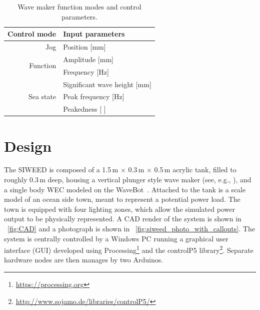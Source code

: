 \documentclass[hardware,article,submit,pdftex,moreauthors]{Definitions/mdpi}
\begin{document}
\begin{table}[tb]
  \caption{Wave maker function modes and control parameters.}
  \label{tab:wave_maker_controls}
  \centering

  \begin{tabular}{rl}
  \hline
  \textbf{Control mode}      & \textbf{Input parameters}        \\
  \hline
  Jog                        & Position {[}mm{]}                \\
  \hline
  \multirow{2}{*}{Function}  & Amplitude {[}mm{]}               \\
                             & Frequency {[}Hz{]}               \\
  \hline
  \multirow{3}{*}{Sea state} & Significant wave height {[}mm{]} \\
                             & Peak frequency {[}Hz{]}          \\
                             & Peakedness {[} {]}               \\       
  \hline
  \end{tabular}
\end{table}


\section{Design} %
The SIWEED is composed of a 1.5\,m $\times{}$ 0.3\,m $\times{}$ 0.5\,m acrylic tank, filled to roughly 0.3\,m deep, housing a vertical plunger style wave maker (see, e.g., \cite{hyun1976simplified}), and a single body WEC modeled on the WaveBot~\cite{Coe2016a}.
Attached to the tank is a scale model of an ocean side town, meant to represent a potential power load.
The town is equipped with four lighting zones, which allow the simulated power output to be physically represented.
A CAD render of the system is shown in \figurename~\ref{fig:CAD} and a photograph is shown in \figurename~\ref{fig:siweed_photo_with_callouts}.
The system is centrally controlled by a Windows PC running a graphical user interface (GUI) developed using Processing\footnote{\url{https://processing.org}} and the controlP5 library\footnote{\url{http://www.sojamo.de/libraries/controlP5/}}.
Separate hardware nodes are then manages by two Arduinos.
\end{document}
